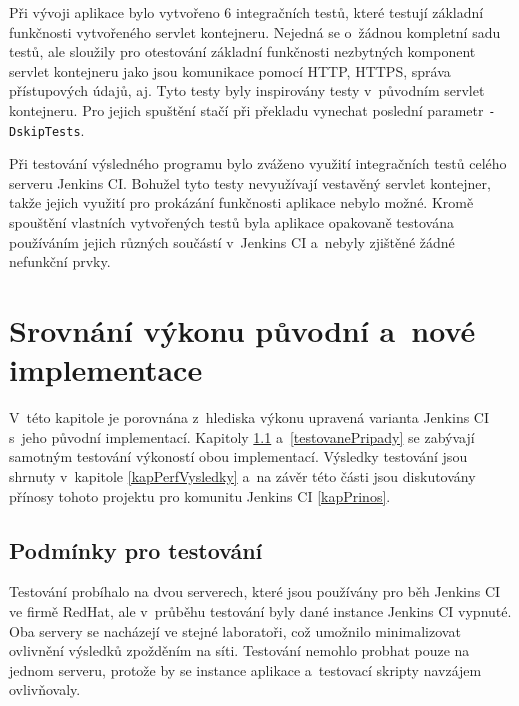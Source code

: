     \medskip
    Při vývoji aplikace bylo vytvořeno 6 integračních testů, které testují základní funkčnosti
    vytvořeného servlet kontejneru. Nejedná se o~žádnou kompletní sadu testů, ale sloužily pro
    otestování základní funkčnosti nezbytných komponent servlet kontejneru jako jsou
    komunikace pomocí HTTP, HTTPS, správa přístupových údajů, aj. Tyto testy byly inspirovány
    testy v~původním servlet kontejneru. Pro jejich spuštění stačí při překladu vynechat poslední
    parametr \texttt{-DskipTests}.

    Při testování výsledného programu bylo zváženo využití integračních testů celého serveru Jenkins CI.
    Bohužel tyto testy nevyužívají vestavěný servlet kontejner, takže jejich využití
    pro prokázání funkčnosti aplikace nebylo možné.
    Kromě spouštění vlastních vytvořených testů byla aplikace opakovaně testována používáním jejich různých součástí
    v~Jenkins CI
    a~nebyly zjištěné žádné nefunkční prvky.

    


\chapter{Srovnání výkonu původní a~nové implementace}  \label{kapPerformance}
    V~této kapitole je porovnána z~hlediska výkonu upravená varianta Jenkins CI s~jeho původní implementací.
    Kapitoly \ref{kapPodminky} a~\ref{testovanePripady} se zabývají samotným testování
    výkoností obou implementací. Výsledky testování jsou shrnuty v~kapitole \ref{kapPerfVysledky}
    a~na závěr této části jsou diskutovány přínosy tohoto projektu pro komunitu Jenkins CI \ref{kapPrinos}.

    \section{Podmínky pro testování}\label{kapPodminky}
        Testování probíhalo na dvou serverech, které jsou používány pro běh Jenkins CI ve firmě RedHat, ale
        v~průběhu testování byly dané instance Jenkins CI vypnuté. 
        Oba servery se nacházejí ve stejné laboratoři, což umožnilo minimalizovat
        ovlivnění výsledků zpožděním na síti. Testování nemohlo probhat pouze na jednom
        serveru, protože by se instance aplikace a~testovací skripty navzájem ovlivňovaly.
        
